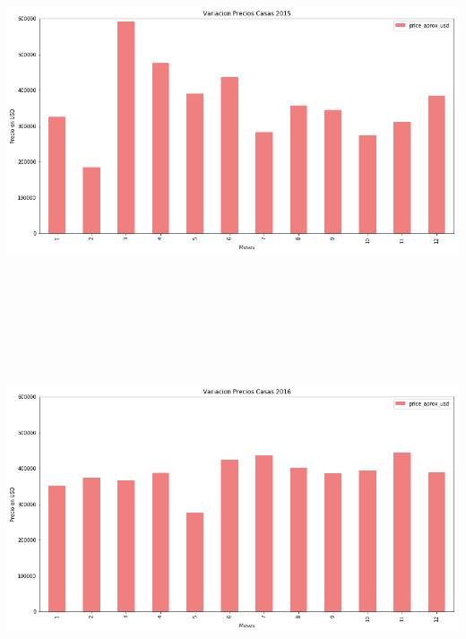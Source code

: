 \documentclass[a4paper, 10pt]{article}
\begin{document}
        \begin{center}
              \includegraphics[width=6in, height=4.2in]{images/vCasas2015}
        \end{center}
        \begin{center}
              \includegraphics[width=6in, height=4.2in]{images/vCasas2016}
        \end{center}
\end{document}
